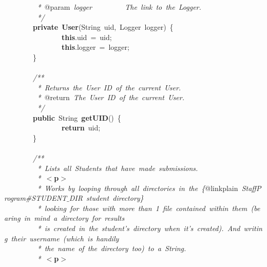 \mbox{}\textit{\ \ \ \ \ \ \ \ \ *\ }@param\textit{\ logger\ \ \ \ \ \ \ \ \ The\ link\ to\ the\ Logger.} \\
\mbox{}\textit{\ \ \ \ \ \ \ \ \ */} \\
\mbox{}\ \ \ \ \ \ \ \ \textbf{private}\ \textbf{User}(String\ uid,\ Logger\ logger)\ \{ \\
\mbox{}\ \ \ \ \ \ \ \ \ \ \ \ \ \ \ \ \textbf{this}.uid\ =\ uid; \\
\mbox{}\ \ \ \ \ \ \ \ \ \ \ \ \ \ \ \ \textbf{this}.logger\ =\ logger; \\
\mbox{}\ \ \ \ \ \ \ \ \} \\
\mbox{} \\
\mbox{}\ \ \ \ \ \ \ \ \textit{/**} \\
\mbox{}\textit{\ \ \ \ \ \ \ \ \ *\ Returns\ the\ User\ ID\ of\ the\ current\ User.} \\
\mbox{}\textit{\ \ \ \ \ \ \ \ \ *\ }@return\textit{\ The\ User\ ID\ of\ the\ current\ User.} \\
\mbox{}\textit{\ \ \ \ \ \ \ \ \ */} \\
\mbox{}\ \ \ \ \ \ \ \ \textbf{public}\ String\ \textbf{getUID}()\ \{ \\
\mbox{}\ \ \ \ \ \ \ \ \ \ \ \ \ \ \ \ \textbf{return}\ uid; \\
\mbox{}\ \ \ \ \ \ \ \ \} \\
\mbox{} \\
\mbox{}\ \ \ \ \ \ \ \ \textit{/**} \\
\mbox{}\textit{\ \ \ \ \ \ \ \ \ *\ Lists\ all\ Students\ that\ have\ made\ submissions.} \\
\mbox{}\textit{\ \ \ \ \ \ \ \ \ *\ }\textbf{$<$p$>$} \\
\mbox{}\textit{\ \ \ \ \ \ \ \ \ *\ Works\ by\ looping\ through\ all\ directories\ in\ the\ \{}@linkplain\textit{\ StaffProgram\#STUDENT$\_$DIR\ student\ directory\}} \\
\mbox{}\textit{\ \ \ \ \ \ \ \ \ *\ looking\ for\ those\ with\ more\ than\ 1\ file\ contained\ within\ them\ (bearing\ in\ mind\ a\ directory\ for\ results} \\
\mbox{}\textit{\ \ \ \ \ \ \ \ \ *\ is\ created\ in\ the\ student's\ directory\ when\ it's\ created).\ And\ writing\ their\ username\ (which\ is\ handily} \\
\mbox{}\textit{\ \ \ \ \ \ \ \ \ *\ the\ name\ of\ the\ directory\ too)\ to\ a\ String.} \\
\mbox{}\textit{\ \ \ \ \ \ \ \ \ *\ }\textbf{$<$p$>$} \\
